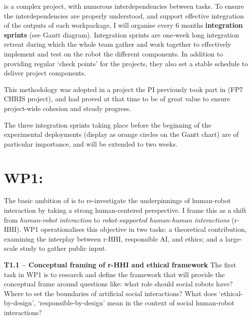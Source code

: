 \project is a complex project, with numerous interdependencies between tasks.
To ensure the interdependencies are properly understood, and support effective
integration of the outputs of each workpackage, I will organise every 6 months
\textbf{integration sprints} (see Gantt diagram). Integration sprints are
one-week long integration retreat during which the whole \project team gather
and work together to effectively implement and test on the robot the different
components. In addition to providing regular `check points' for the projects,
they also set a stable schedule to deliver project components.

This methodology was adopted in a project the PI previously took part in (FP7
CHRIS project), and had proved at that time to be of great value to ensure
project-wide cohesion and steady progress.

The three integration sprints taking place before the beginning of the
experimental deployments (display as orange circles on the Gantt chart) are of
particular importance, and will be extended to two weeks.


\section{WP1: \textbf{\wpOne}}

The basic ambition of \project is to re-investigate the underpinnings of
human-robot interaction by taking a strong human-centered perspective. I frame
this as a shift from \emph{human-robot interaction} to \emph{robot-supported
human-human interactions} (r-HHI). WP1 operationalises this objective in two
tasks: a theoretical contribution, examining the interplay between r-HHI,
responsible AI, and ethics; and a large-scale study to gather public input.

\textbf{T1.1 -- Conceptual framing of r-HHI and ethical framework} 
The first task in WP1 is to research and define the framework that will provide
the conceptual frame around questions like: what role should social robots have?
Where to set the boundaries of artificial social interactions? What does
`ethical-by-design', `responsible-by-design' mean in the context of social
human-robot interactions?

